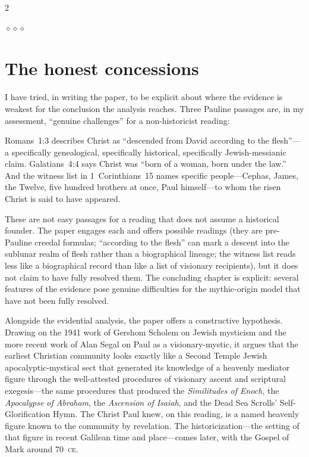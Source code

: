 \documentclass[11pt,oneside]{article}
\newcommand{\sectbreak}{%
  \par\vspace{1.3em}
  \noindent\hfil
  {\color{accent}$\diamond$\hspace{0.5em}$\diamond$\hspace{0.5em}$\diamond$}%
  \hfil\par\vspace{1em}}
\begin{document}
\begin{multicols}{2}
\sectbreak
\section*{The honest concessions}

I have tried, in writing the paper, to be explicit about where the
evidence is weakest for the conclusion the analysis reaches.  Three
Pauline passages are, in my assessment, \enquote{genuine challenges}
for a non-historicist reading:

Romans~1:3 describes Christ as \enquote{descended from David
according to the flesh}---a specifically genealogical, specifically
historical, specifically Jewish-messianic claim.  Galatians~4:4
says Christ was \enquote{born of a woman, born under the law.}  And
the witness list in 1~Corinthians~15 names specific
people---Cephas, James, the Twelve, five hundred brothers at once,
Paul himself---to whom the risen Christ is said to have appeared.

These are not easy passages for a reading that does not assume a
historical founder.  The paper engages each and offers possible
readings (they are pre-Pauline creedal formulas; \enquote{according
to the flesh} can mark a descent into the sublunar realm of flesh
rather than a biographical lineage; the witness list reads less
like a biographical record than like a list of visionary
recipients), but it does not claim to have fully resolved them.
The concluding chapter is explicit: several features of the
evidence pose genuine difficulties for the mythic-origin model that
have not been fully resolved.

Alongside the evidential analysis, the paper offers a constructive
hypothesis.  Drawing on the 1941 work of Gershom Scholem on Jewish
mysticism and the more recent work of Alan Segal on Paul as a
visionary-mystic, it argues that the earliest Christian community
looks exactly like a Second Temple Jewish apocalyptic-mystical sect
that generated its knowledge of a heavenly mediator figure through
the well-attested procedures of visionary ascent and scriptural
exegesis---the same procedures that produced the
\textit{Similitudes of Enoch}, the \textit{Apocalypse of Abraham},
the \textit{Ascension of Isaiah}, and the Dead Sea Scrolls'
Self-Glorification Hymn.  The Christ Paul knew, on this reading, is
a named heavenly figure known to the community by revelation.  The
historicization---the setting of that figure in recent Galilean
time and place---comes later, with the Gospel of Mark around
70~\textsc{ce}.


\end{multicols}
\end{document}
